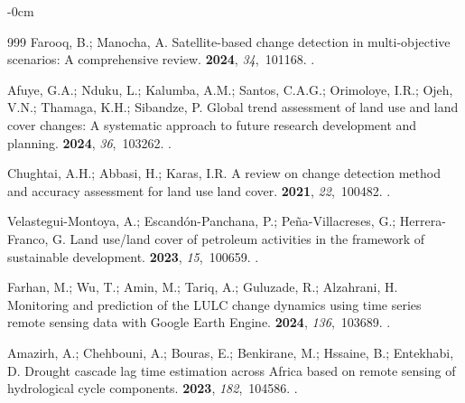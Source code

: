 \documentclass[jimaging,article,accept,pdftex,moreauthors]{Definitions/mdpi}
\begin{document}
\begin{adjustwidth}{-\extralength}{0cm}
\begin{thebibliography}{999}
Farooq, B.; Manocha, A.
\newblock Satellite-based change detection in multi-objective scenarios: A
  comprehensive review.
 {\bf
  2024}, {\em 34},~101168.
.

Afuye, G.A.; Nduku, L.; Kalumba, A.M.; Santos, C.A.G.; Orimoloye, I.R.; Ojeh,
  V.N.; Thamaga, K.H.; Sibandze, P.
\newblock Global trend assessment of land use and land cover changes: A
  systematic approach to future research development and planning.
 {\bf 2024}, {\em
  36},~103262.
.

Chughtai, A.H.; Abbasi, H.; Karas, I.R.
\newblock A review on change detection method and accuracy assessment for land
  use land cover.
 {\bf
  2021}, {\em 22},~100482.
.

Velastegui-Montoya, A.; Escandón-Panchana, P.; Peña-Villacreses, G.;
  Herrera-Franco, G.
\newblock Land use/land cover of petroleum activities in the framework of
  sustainable development.
 {\bf 2023}, {\em
  15},~100659.
.

Farhan, M.; Wu, T.; Amin, M.; Tariq, A.; Guluzade, R.; Alzahrani, H.
\newblock Monitoring and prediction of the LULC change dynamics using time
  series remote sensing data with Google Earth Engine.
 {\bf 2024},
  {\em 136},~103689.
.

Amazirh, A.; Chehbouni, A.; Bouras, E.; Benkirane, M.; Hssaine, B.; Entekhabi,
  D.
\newblock Drought cascade lag time estimation across Africa based on remote
  sensing of hydrological cycle components.
 {\bf 2023}, {\em 182},~104586.
.


\end{thebibliography}
\end{adjustwidth}
\end{document}
